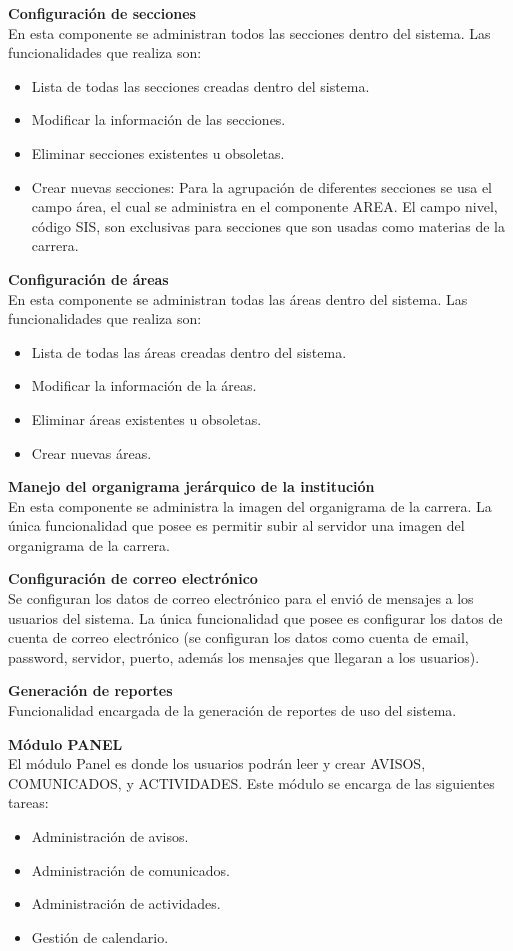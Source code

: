 \documentclass[10pt,letterpaper,twoside]{article}
\newcommand{\btext}[1]{
    \vspace{10mm}
    {{\textcolor{titlecolor}{\large{\textbf{\textsf{#1}}}}}}
    \vspace{5mm}
    \\
}
\newcommand{\ctext}[1]{
    \vspace{5mm}
    {{\textcolor{titlecolor}{\large{\textbf{\textsf{#1}}}}}}
    \\
}
\begin{document}
\begin{multicols}{2}
\ctext{Configuración de secciones}
En esta componente se administran todos las secciones dentro del sistema.
Las funcionalidades que realiza son:
\begin{itemize}
    \item Lista de todas las secciones creadas dentro del sistema.
    \item Modificar la información de las secciones.
    \item Eliminar secciones existentes u obsoletas.
    \item Crear nuevas secciones: Para la agrupación de diferentes secciones se usa el campo área, el cual se administra en el componente AREA. El campo nivel, código SIS, son exclusivas para secciones que son usadas como materias de la carrera.
\end{itemize}

\ctext{Configuración de áreas}
En esta componente se administran todas las áreas dentro del sistema.
Las funcionalidades que realiza son:
\begin{itemize}
    \item Lista de todas las áreas creadas dentro del sistema.
    \item Modificar la información de la áreas.
    \item Eliminar áreas existentes u obsoletas.
    \item Crear nuevas áreas.
\end{itemize}

\ctext{Manejo del organigrama jerárquico de la institución}
En esta componente se administra la imagen del organigrama de la carrera. La única funcionalidad que posee es permitir subir al servidor una imagen del organigrama de la carrera.

\ctext{Configuración de correo electrónico}
Se configuran los datos de correo electrónico para el envió de mensajes a los usuarios del sistema.
La única funcionalidad que posee es configurar los datos de cuenta de correo electrónico (se configuran los datos como cuenta de email, password, servidor, puerto, además los mensajes que llegaran a los usuarios).

\ctext{Generación de reportes}
Funcionalidad encargada de la generación de reportes de uso del sistema.

\btext{Módulo PANEL}
El módulo Panel es donde los usuarios podrán leer y crear AVISOS, COMUNICADOS, y ACTIVIDADES.
Este módulo se encarga de las siguientes tareas:
\begin{itemize}
    \item Administración de avisos.
    \item Administración de comunicados.
    \item Administración de actividades.
    \item Gestión de calendario.
\end{itemize}


\end{multicols}
\end{document}
